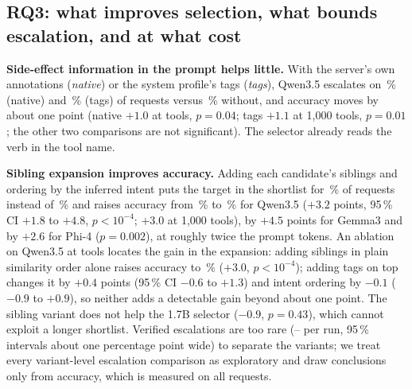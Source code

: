 

\subsection{RQ3: what improves selection, what bounds escalation, and at what cost}
\textbf{Side-effect information in the prompt helps little.} With the server's own annotations
(\emph{native}) or the system profile's tags (\emph{tags}), Qwen3.5 escalates on
\SelQNativePoolConf\,\% (native) and \SelQTagsPoolConf\,\% (tags) of requests versus \SelQPlainPoolConf\,\% without,
and accuracy moves by about one point (native $+1.0$ at \NumPoolTools{} tools, $p=0.04$; tags
$+1.1$ at 1,000 tools, $p=0.01$; the other two comparisons are not significant). The selector already
reads the verb in the tool name.

\textbf{Sibling expansion improves accuracy.} Adding each candidate's siblings and ordering by
the inferred intent puts the target in the shortlist for \SelQSiblingPoolInCand\,\% of requests
instead of \SelQPlainPoolInCand\,\% and raises accuracy from \SelQPlainPoolAcc\,\% to
\SelQSiblingPoolAcc\,\% for Qwen3.5 ($+3.2$ points, 95\,\% CI $+1.8$ to $+4.8$, $p<10^{-4}$; $+3.0$ at
1,000 tools), by $+4.5$ points for Gemma3 and by $+2.6$ for Phi-4 ($p=0.002$), at roughly twice the prompt
tokens. An ablation on Qwen3.5 at \NumPoolTools{} tools locates the gain in the expansion: adding siblings in plain
similarity order alone raises accuracy to \SelQExpandPoolAcc\,\% ($+3.0$, $p<10^{-4}$); adding tags on top
changes it by $+0.4$ points (95\,\% CI $-0.6$ to $+1.3$) and intent ordering by $-0.1$ ($-0.9$ to $+0.9$),
so neither adds a detectable gain beyond about one point. The sibling variant does not help the 1.7B
selector ($-0.9$, $p=0.43$), which cannot exploit a longer shortlist. Verified escalations are too
rare (\ConfNMin--\ConfNMax{} per run, 95\,\% intervals about one percentage point wide) to separate
the variants; we treat every variant-level escalation comparison as exploratory and draw
conclusions only from accuracy, which is measured on all requests.

